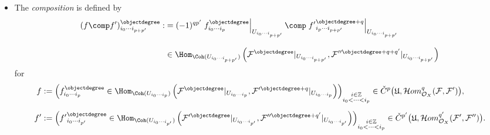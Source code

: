 \begin{dfn}
\begin{itemize}
The \emph{dg-morphism space}
from $\mathcal{F}$ to $\mathcal{F}'$
is a cochain complex of $\field$-modules
whose degree $k$-component is given by
\begin{align*}
\hom_{\Coh(X;\mathfrak{U})_{\dg}}^k
\left(
\mathcal{F},\mathcal{F}'
\right)
:&=
\bigoplus_{p+q=k}
\check{C}^p\big(\mathfrak{U},\mathcal{H}om_{\mathcal{O}_X}^q
(\mathcal{F},\mathcal{F}')
\big),
\\[2mm]
&=
\bigoplus_{p+q=k}
\prod_{i_0<\cdots<i_p}\bigoplus_{\objectdegree\in\mathbb{Z}}
\Hom_{\Coh(U_{i_0\cdots i_p})}\left(\mathcal{F}^{\objectdegree}|_{U_{i_0\cdots i_p}},\mathcal{F}'^{\objectdegree+q}|_{U_{i_0\cdots i_p}}\right)
\end{align*}
and the \emph{differential} is given by
the total differential
$$
D
:=
\delta + (-1)^p d_{\mathcal{H}om}.
$$
%
%

\item
The \emph{composition}
is defined by
\begin{align*}
(f\comp f')_{i_0\cdots i_{p+p'}}^{\objectdegree}
:&=
(-1)^{qp'}
\left.
f_{i_0\cdots i_p}^{\objectdegree}
\right|_{U_{i_0\cdots i_{p+p'}}}
\comp
\left.
{f'}_{i_p\cdots i_{p+p'}}^{\objectdegree+q}
\right|_{U_{i_0\cdots i_{p+p'}}}
\\[3mm]
&\in
\Hom_{\Coh(U_{i_0\cdots i_{p+p'}})}\left(\mathcal{F}^{\objectdegree}|_{U_{i_0\cdots i_{p+p'}}},\mathcal{F}''^{\objectdegree+q+q'}|_{U_{i_0\cdots i_{p+p'}}}\right)
\end{align*}
for
\begin{align*}
f
&:=
\left(
f_{i_0\cdots i_p}^{\objectdegree}
\in
\Hom_{\Coh(U_{i_0\cdots i_p})}\left(\mathcal{F}^{\objectdegree}|_{U_{i_0\cdots i_p}},\mathcal{F}'^{\objectdegree+q}|_{U_{i_0\cdots i_p}}\right)
\right)_{
\substack{
i\in\mathbb{Z}
\\
i_0<\cdots<i_p
}
}
\in
\check{C}^p\big(
\mathfrak{U},\mathcal{H}om_{\mathcal{O}_X}^q(\mathcal{F},\mathcal{F}')
\big),
\\[2mm]
f'
&:=
\left(
{f'}_{i_0\cdots i_{p'}}^{\objectdegree}
\in
\Hom_{\Coh(U_{i_0\cdots i_{p'}})}\left(\mathcal{F}'^{\objectdegree}|_{U_{i_0\cdots i_{p'}}},\mathcal{F}''^{\objectdegree+q'}|_{U_{i_0\cdots i_{p'}}}\right)
\right)_{
\substack{
i\in\mathbb{Z}
\\
i_0<\cdots<i_p
}
}
\in
\check{C}^{p'}\big(
\mathfrak{U},\mathcal{H}om_{\mathcal{O}_X}^{q'}(\mathcal{F}',\mathcal{F}'')
\big).
\end{align*}


\end{itemize}
\end{dfn}
